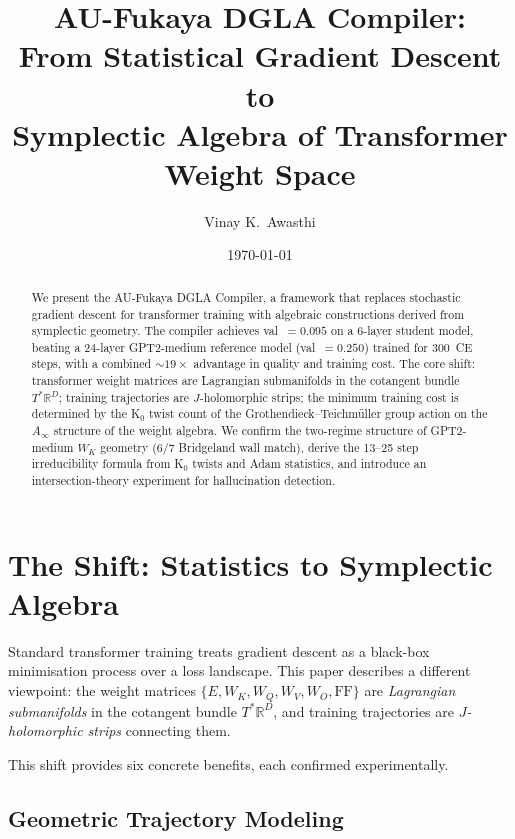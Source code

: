 \documentclass[11pt]{amsart}
\title{AU-Fukaya DGLA Compiler:\\
From Statistical Gradient Descent to\\
Symplectic Algebra of Transformer Weight Space}
\author{Vinay K.\ Awasthi}
\date{\today}
\begin{document}
\maketitle
\thispagestyle{plain}

\begin{abstract}
We present the AU-Fukaya DGLA Compiler, a framework that replaces
stochastic gradient descent for transformer training with algebraic
constructions derived from symplectic geometry.
The compiler achieves val~$=0.095$ on a 6-layer student model,
beating a 24-layer GPT2-medium reference model (val~$=0.250$) trained for 300~CE steps,
with a combined $\sim\!19\times$ advantage in quality and training cost.
The core shift: transformer weight matrices are Lagrangian submanifolds
in the cotangent bundle $T^*\mathbb{R}^D$; training trajectories are
$J$-holomorphic strips; the minimum training cost is determined by the
K$_0$ twist count of the Grothendieck--Teichmüller group action on
the $A_\infty$ structure of the weight algebra.
We confirm the two-regime structure of GPT2-medium $W_K$ geometry
(6/7 Bridgeland wall match), derive the 13--25 step irreducibility
formula from K$_0$ twists and Adam statistics, and introduce an
intersection-theory experiment for hallucination detection.
\end{abstract}

\tableofcontents

\section{The Shift: Statistics to Symplectic Algebra}
\label{sec:shift}

Standard transformer training treats gradient descent as a black-box
minimisation process over a loss landscape.
This paper describes a different viewpoint: the weight matrices
$\{E, W_K, W_Q, W_V, W_O, \mathrm{FF}\}$ are
\emph{Lagrangian submanifolds} in the cotangent bundle $T^*\mathbb{R}^D$,
and training trajectories are \emph{$J$-holomorphic strips} connecting them.

This shift provides six concrete benefits, each confirmed experimentally.

\subsection{Geometric Trajectory Modeling}
\end{document}
